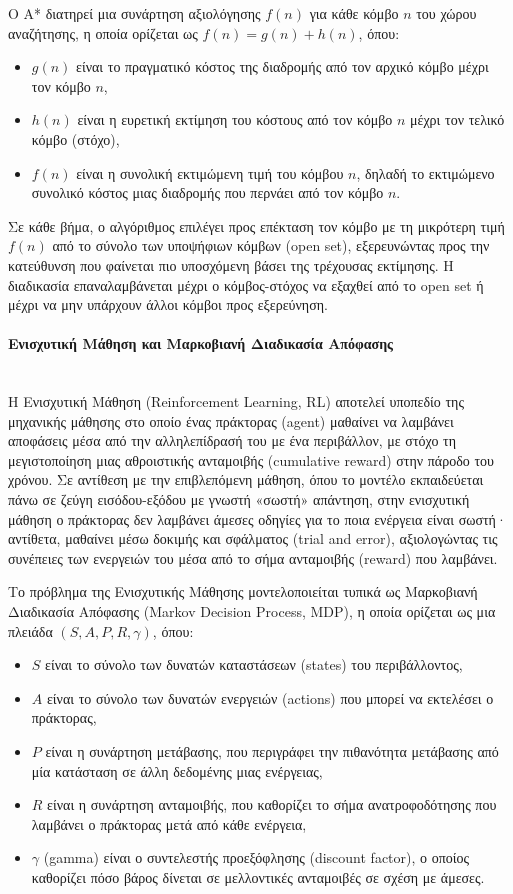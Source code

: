 \documentclass[12pt]{article}
\begin{document}
Ο A* διατηρεί μια συνάρτηση αξιολόγησης $f(n)$ για κάθε κόμβο $n$ του χώρου αναζήτησης, η οποία ορίζεται ως $f(n) = g(n) + h(n)$, όπου:

\begin{itemize}
    \item $g(n)$ είναι το πραγματικό κόστος της διαδρομής από τον αρχικό κόμβο μέχρι τον κόμβο $n$,
    \item $h(n)$ είναι η ευρετική εκτίμηση του κόστους από τον κόμβο $n$ μέχρι τον τελικό κόμβο (στόχο),
    \item $f(n)$ είναι η συνολική εκτιμώμενη τιμή του κόμβου $n$, δηλαδή το εκτιμώμενο συνολικό κόστος μιας διαδρομής που περνάει από τον κόμβο $n$.
\end{itemize}

Σε κάθε βήμα, ο αλγόριθμος επιλέγει προς επέκταση τον κόμβο με τη μικρότερη τιμή $f(n)$ από το σύνολο των υποψήφιων κόμβων (open set), εξερευνώντας προς την κατεύθυνση που φαίνεται πιο υποσχόμενη βάσει της τρέχουσας εκτίμησης. Η διαδικασία επαναλαμβάνεται μέχρι ο κόμβος-στόχος να εξαχθεί από το open set ή μέχρι να μην υπάρχουν άλλοι κόμβοι προς εξερεύνηση.

\paragraph{Ενισχυτική Μάθηση και Μαρκοβιανή Διαδικασία Απόφασης}~\\
Η Ενισχυτική Μάθηση (Reinforcement Learning, RL) αποτελεί υποπεδίο της μηχανικής μάθησης στο οποίο ένας πράκτορας (agent) μαθαίνει να λαμβάνει αποφάσεις μέσα από την αλληλεπίδρασή του με ένα περιβάλλον, με στόχο τη μεγιστοποίηση μιας αθροιστικής ανταμοιβής (cumulative reward) στην πάροδο του χρόνου. Σε αντίθεση με την επιβλεπόμενη μάθηση, όπου το μοντέλο εκπαιδεύεται πάνω σε ζεύγη εισόδου-εξόδου με γνωστή «σωστή» απάντηση, στην ενισχυτική μάθηση ο πράκτορας δεν λαμβάνει άμεσες οδηγίες για το ποια ενέργεια είναι σωστή· αντίθετα, μαθαίνει μέσω δοκιμής και σφάλματος (trial and error), αξιολογώντας τις συνέπειες των ενεργειών του μέσα από το σήμα ανταμοιβής (reward) που λαμβάνει.

Το πρόβλημα της Ενισχυτικής Μάθησης μοντελοποιείται τυπικά ως Μαρκοβιανή Διαδικασία Απόφασης (Markov Decision Process, MDP), η οποία ορίζεται ως μια πλειάδα $(S, A, P, R, \gamma)$, όπου:
\begin{itemize}
	\item $S$ είναι το σύνολο των δυνατών καταστάσεων (states) του περιβάλλοντος,
	\item $A$ είναι το σύνολο των δυνατών ενεργειών (actions) που μπορεί να εκτελέσει ο πράκτορας,
	\item $P$ είναι η συνάρτηση μετάβασης, που περιγράφει την πιθανότητα μετάβασης από μία κατάσταση σε άλλη δεδομένης μιας ενέργειας,
	\item $R$ είναι η συνάρτηση ανταμοιβής, που καθορίζει το σήμα ανατροφοδότησης που λαμβάνει ο πράκτορας μετά από κάθε ενέργεια,
	\item $\gamma$ (gamma) είναι ο συντελεστής προεξόφλησης (discount factor), ο οποίος καθορίζει πόσο βάρος δίνεται σε μελλοντικές ανταμοιβές σε σχέση με άμεσες.
\end{itemize}
\end{document}
